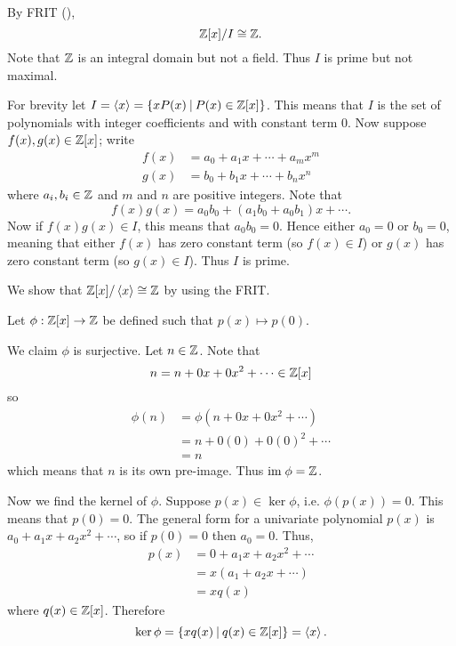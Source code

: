 \begin{questions}
\begin{partquestions}{\roman*}
        By FRIT (),
        \[
            \mathbb{Z}[x]/I \cong \mathbb{Z}.
        \]
        Note that $\mathbb{Z}$ is an integral domain but not a field. Thus $I$ is prime but not maximal.
    \end{partquestions}

    \item For brevity let $I = \princ{x} = \{xP(x) \vert P(x) \in \Z[x]\}$. This means that $I$ is the set of polynomials with integer coefficients and with constant term 0. Now suppose $f(x), g(x) \in \mathbb{Z}[x]$; write
    \begin{align*}
        f(x) &= a_0 + a_1x + \cdots + a_mx^m\\
        g(x) &= b_0 + b_1x + \cdots + b_nx^n
    \end{align*}
    where $a_i, b_i \in \mathbb{Z}$ and $m$ and $n$ are positive integers. Note that
    \[
        f(x)g(x) = a_0b_0 + (a_1b_0+a_0b_1)x + \cdots.
    \]
    Now if $f(x)g(x) \in I$, this means that $a_0b_0 = 0$. Hence either $a_0 = 0$ or $b_0 = 0$, meaning that either $f(x)$ has zero constant term (so $f(x) \in I$) or $g(x)$ has zero constant term (so $g(x) \in I$). Thus $I$ is prime.

    \item We show that $\mathbb{Z}[x] / \left\langle x\right\rangle \cong \mathbb{Z}$ by using the FRIT.

    Let $\phi: \mathbb{Z}[x] \to \mathbb{Z}$ be defined such that $p(x) \mapsto p(0)$.

    We claim $\phi$ is surjective. Let $n \in \mathbb{Z}$. Note that
    \[
        n = n + 0x + 0x^2 + \cdots \in \mathbb{Z}[x]
    \]
    so
    \begin{align*}
        \phi(n) &= \phi(n + 0x + 0x^2 + \cdots)\\
        &= n + 0(0) + 0(0)^2 + \cdots\\
        &= n
    \end{align*}
    which means that $n$ is its own pre-image. Thus $\mathrm{im}\;\phi = \mathbb{Z}$.

    Now we find the kernel of $\phi$. Suppose $p(x) \in \ker\phi$, i.e. $\phi(p(x)) = 0$. This means that $p(0) = 0$. The general form for a univariate polynomial $p(x)$ is $a_0 + a_1x + a_2x^2 + \cdots$, so if $p(0) = 0$ then $a_0 = 0$. Thus,
    \begin{align*}
        p(x) &= 0 + a_1x + a_2x^2 + \cdots\\
        &= x(a_1 + a_2x + \cdots)\\
        &= xq(x)
    \end{align*}
    where $q(x) \in \mathbb{Z}[x]$. Therefore
    \[
        \ker\phi = \{xq(x) \vert q(x) \in \Z[x]\} = \princ{x}.
    \]


\end{questions}
